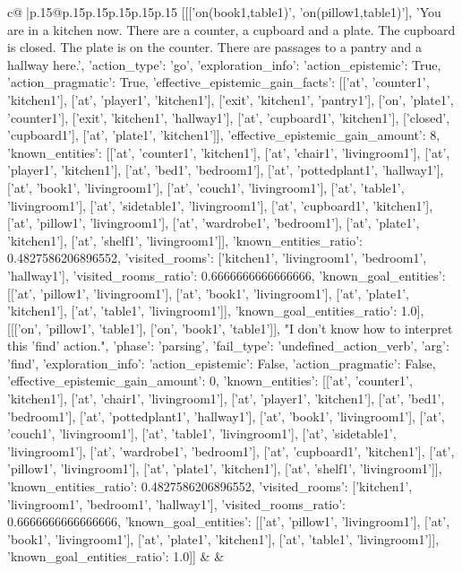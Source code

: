 \documentclass{article}
\begin{document}
{\begin{supertabular}{c@{$\;$}|p{.15\linewidth}@{}p{.15\linewidth}p{.15\linewidth}p{.15\linewidth}p{.15\linewidth}p{.15\linewidth}}
{{{	 [[['on(book1,table1)', 'on(pillow1,table1)'], 'You are in a kitchen now. There are a counter, a cupboard and a plate. The cupboard is closed. The plate is on the counter. There are passages to a pantry and a hallway here.', {'action_type': 'go', 'exploration_info': {'action_epistemic': True, 'action_pragmatic': True, 'effective_epistemic_gain_facts': [['at', 'counter1', 'kitchen1'], ['at', 'player1', 'kitchen1'], ['exit', 'kitchen1', 'pantry1'], ['on', 'plate1', 'counter1'], ['exit', 'kitchen1', 'hallway1'], ['at', 'cupboard1', 'kitchen1'], ['closed', 'cupboard1'], ['at', 'plate1', 'kitchen1']], 'effective_epistemic_gain_amount': 8, 'known_entities': [['at', 'counter1', 'kitchen1'], ['at', 'chair1', 'livingroom1'], ['at', 'player1', 'kitchen1'], ['at', 'bed1', 'bedroom1'], ['at', 'pottedplant1', 'hallway1'], ['at', 'book1', 'livingroom1'], ['at', 'couch1', 'livingroom1'], ['at', 'table1', 'livingroom1'], ['at', 'sidetable1', 'livingroom1'], ['at', 'cupboard1', 'kitchen1'], ['at', 'pillow1', 'livingroom1'], ['at', 'wardrobe1', 'bedroom1'], ['at', 'plate1', 'kitchen1'], ['at', 'shelf1', 'livingroom1']], 'known_entities_ratio': 0.4827586206896552, 'visited_rooms': ['kitchen1', 'livingroom1', 'bedroom1', 'hallway1'], 'visited_rooms_ratio': 0.6666666666666666, 'known_goal_entities': [['at', 'pillow1', 'livingroom1'], ['at', 'book1', 'livingroom1'], ['at', 'plate1', 'kitchen1'], ['at', 'table1', 'livingroom1']], 'known_goal_entities_ratio': 1.0}}], [[['on', 'pillow1', 'table1'], ['on', 'book1', 'table1']], "I don't know how to interpret this 'find' action.", {'phase': 'parsing', 'fail_type': 'undefined_action_verb', 'arg': 'find', 'exploration_info': {'action_epistemic': False, 'action_pragmatic': False, 'effective_epistemic_gain_amount': 0, 'known_entities': [['at', 'counter1', 'kitchen1'], ['at', 'chair1', 'livingroom1'], ['at', 'player1', 'kitchen1'], ['at', 'bed1', 'bedroom1'], ['at', 'pottedplant1', 'hallway1'], ['at', 'book1', 'livingroom1'], ['at', 'couch1', 'livingroom1'], ['at', 'table1', 'livingroom1'], ['at', 'sidetable1', 'livingroom1'], ['at', 'wardrobe1', 'bedroom1'], ['at', 'cupboard1', 'kitchen1'], ['at', 'pillow1', 'livingroom1'], ['at', 'plate1', 'kitchen1'], ['at', 'shelf1', 'livingroom1']], 'known_entities_ratio': 0.4827586206896552, 'visited_rooms': ['kitchen1', 'livingroom1', 'bedroom1', 'hallway1'], 'visited_rooms_ratio': 0.6666666666666666, 'known_goal_entities': [['at', 'pillow1', 'livingroom1'], ['at', 'book1', 'livingroom1'], ['at', 'plate1', 'kitchen1'], ['at', 'table1', 'livingroom1']], 'known_goal_entities_ratio': 1.0}}]] 
	  } 
	   } 
	   } 
	 & & \\ 
 


\end{supertabular}}
\end{document}
